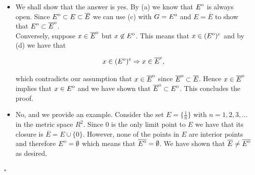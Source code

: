 \documentclass[11pt]{article}
\newcommand{\interior}[1]{{\kern0pt#1}^{\mathrm{o}}}
\begin{document}
\begin{itemize}
\item[(e)] We shall show that the answer is yes. By (a) we know that
  $\interior{E}$ is always open. Since
  $\interior{E} \subset E \subset \overline{E}$ we can use (c) with
  $G = \interior{E}$ and $E = \overline{E}$ to show that
  $\interior{E} \subset \interior{\overline{E}}$. \\

  Conversely, suppose $x \in \interior{\overline{E}}$ but
  $x \not\in \interior{E}$. This means that $x \in (\interior{E})^c$
  and by (d) we have that

  $$ x \in (\interior{E})^c \Rightarrow x \in \overline{E}^c,$$

  which contradicts our assumption that
  $x \in \interior{\overline{E}}$ since
  $\interior{\overline{E}} \subset \overline{E}$. Hence
  $x \in \interior{\overline{E}}$ implies that $x\in \interior{E}$ and
  we have shown that $\interior{\overline{E}} \subset
  \interior{E}$. This concludes the proof.

\item[(f)] No, and we provide an example. Consider the set
  $E = \{ \frac{1}{n} \}$ with $n = 1, 2, 3, \dots$ in the metric
  space $R^2$. Since $0$ is the only limit point to $E$ we have that
  its closure is $\overline{E} = E \cup \{ 0 \}$. However, none of the
  points in $E$ are interior points and therefore
  $\interior{E} = \emptyset$ which means that
  $\overline{\interior{E}} = \emptyset$. We have shown that
  $\overline{E} \neq \overline{\interior{E}}$ as desired.

\end{itemize}

\hfill $\square$
\end{document}
